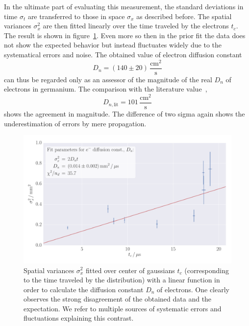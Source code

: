 In the ultimate part of evaluating this measurement, the standard deviations in 
time $\sigma_t$ are transferred to those in space $\sigma_x$ as described before. 
The spatial variances $\sigma_x^2$ are then fitted linearly over the time 
traveled by the electrons $t_c$. The result is shown in figure~\ref{fig:h_s_D_d}.
Even more so then in the prior fit the data does not show the expected behavior 
but instead fluctuates widely due to the systematical errors and noise. 
The obtained value of electron diffusion constant 
\begin{equation}
    D_n = (140 \pm 20)\, \mathrm{\frac{cm^2}{s}} 
\end{equation}
can thus be regarded only as an assessor of the magnitude of the real $D_n$ 
of electrons in germanium. The comparison with the literature value~\cite{staatsexamen}, 
\begin{equation}
    D_{n, \mathrm{lit}} = 101\, \mathrm{\frac{cm^2}{s}}
\end{equation}
shows the agreement in magnitude. The difference of two sigma again shows the 
underestimation of errors by mere propagation. 

\begin{figure}
    \includegraphics[width=1.0\textwidth]{figures/haynes_shockley_D_d}
    \caption{
        Spatial variances $\sigma_x^2$ fitted over center of gaussians $t_c$ 
        (corresponding to the time traveled by the distribution) with a linear 
        function in order to calculate the diffusion constant $D_n$ of electrons. 
        One clearly observes the strong disagreement of the obtained data and the 
        expectation. We refer to multiple sources of systematic errors and fluctuations 
        explaining this contrast. 
        }
    \label{fig:h_s_D_d}
\end{figure}
\FloatBarrier

